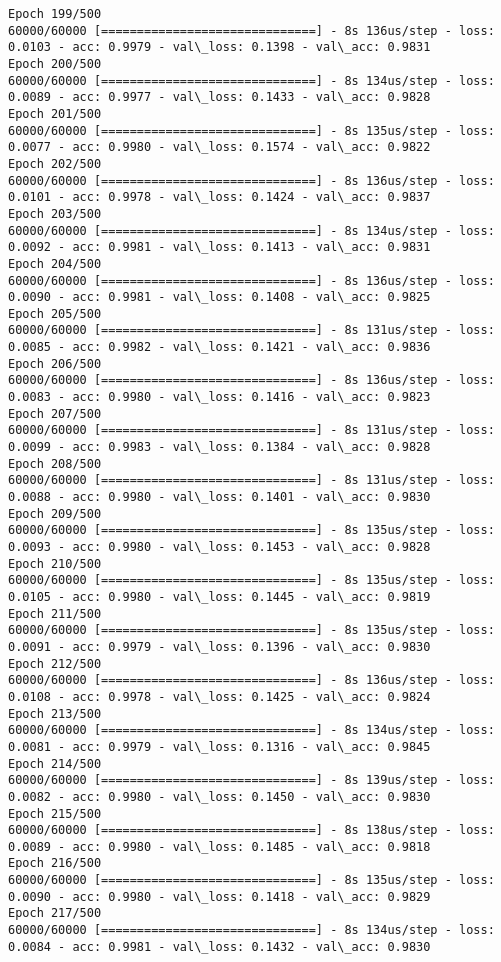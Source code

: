 \documentclass[11pt]{article}
\begin{document}
\begin{Verbatim}[commandchars=\\\{\}]
Epoch 199/500
60000/60000 [==============================] - 8s 136us/step - loss: 0.0103 - acc: 0.9979 - val\_loss: 0.1398 - val\_acc: 0.9831
Epoch 200/500
60000/60000 [==============================] - 8s 134us/step - loss: 0.0089 - acc: 0.9977 - val\_loss: 0.1433 - val\_acc: 0.9828
Epoch 201/500
60000/60000 [==============================] - 8s 135us/step - loss: 0.0077 - acc: 0.9980 - val\_loss: 0.1574 - val\_acc: 0.9822
Epoch 202/500
60000/60000 [==============================] - 8s 136us/step - loss: 0.0101 - acc: 0.9978 - val\_loss: 0.1424 - val\_acc: 0.9837
Epoch 203/500
60000/60000 [==============================] - 8s 134us/step - loss: 0.0092 - acc: 0.9981 - val\_loss: 0.1413 - val\_acc: 0.9831
Epoch 204/500
60000/60000 [==============================] - 8s 136us/step - loss: 0.0090 - acc: 0.9981 - val\_loss: 0.1408 - val\_acc: 0.9825
Epoch 205/500
60000/60000 [==============================] - 8s 131us/step - loss: 0.0085 - acc: 0.9982 - val\_loss: 0.1421 - val\_acc: 0.9836
Epoch 206/500
60000/60000 [==============================] - 8s 136us/step - loss: 0.0083 - acc: 0.9980 - val\_loss: 0.1416 - val\_acc: 0.9823
Epoch 207/500
60000/60000 [==============================] - 8s 131us/step - loss: 0.0099 - acc: 0.9983 - val\_loss: 0.1384 - val\_acc: 0.9828
Epoch 208/500
60000/60000 [==============================] - 8s 131us/step - loss: 0.0088 - acc: 0.9980 - val\_loss: 0.1401 - val\_acc: 0.9830
Epoch 209/500
60000/60000 [==============================] - 8s 135us/step - loss: 0.0093 - acc: 0.9980 - val\_loss: 0.1453 - val\_acc: 0.9828
Epoch 210/500
60000/60000 [==============================] - 8s 135us/step - loss: 0.0105 - acc: 0.9980 - val\_loss: 0.1445 - val\_acc: 0.9819
Epoch 211/500
60000/60000 [==============================] - 8s 135us/step - loss: 0.0091 - acc: 0.9979 - val\_loss: 0.1396 - val\_acc: 0.9830
Epoch 212/500
60000/60000 [==============================] - 8s 136us/step - loss: 0.0108 - acc: 0.9978 - val\_loss: 0.1425 - val\_acc: 0.9824
Epoch 213/500
60000/60000 [==============================] - 8s 134us/step - loss: 0.0081 - acc: 0.9979 - val\_loss: 0.1316 - val\_acc: 0.9845
Epoch 214/500
60000/60000 [==============================] - 8s 139us/step - loss: 0.0082 - acc: 0.9980 - val\_loss: 0.1450 - val\_acc: 0.9830
Epoch 215/500
60000/60000 [==============================] - 8s 138us/step - loss: 0.0089 - acc: 0.9980 - val\_loss: 0.1485 - val\_acc: 0.9818
Epoch 216/500
60000/60000 [==============================] - 8s 135us/step - loss: 0.0090 - acc: 0.9980 - val\_loss: 0.1418 - val\_acc: 0.9829
Epoch 217/500
60000/60000 [==============================] - 8s 134us/step - loss: 0.0084 - acc: 0.9981 - val\_loss: 0.1432 - val\_acc: 0.9830

\end{Verbatim}
\end{document}
